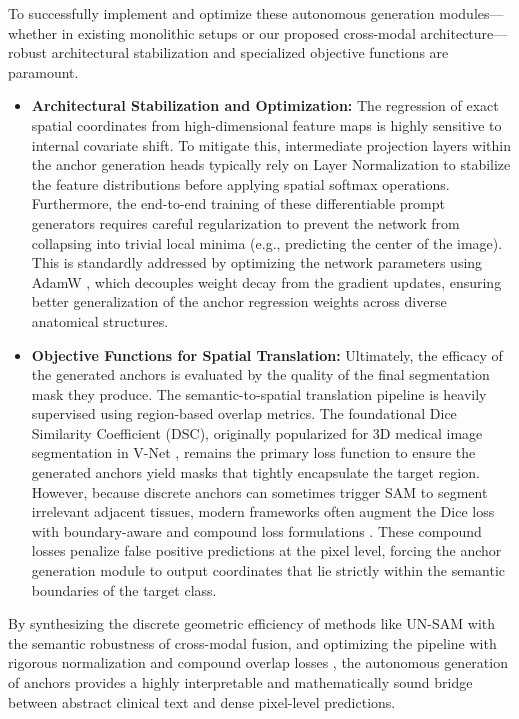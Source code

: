 \documentclass[onecolumn]{IEEEtran}
\numberwithin{equation}{section}
\theoremstyle{definition}
\theoremstyle{remark}
\begin{document}
To successfully implement and optimize these autonomous generation modules—whether in existing monolithic setups or our proposed cross-modal architecture—robust architectural stabilization and specialized objective functions are paramount. 
\begin{itemize}
    \item \textbf{Architectural Stabilization and Optimization:} The regression of exact spatial coordinates from high-dimensional feature maps is highly sensitive to internal covariate shift. To mitigate this, intermediate projection layers within the anchor generation heads typically rely on Layer Normalization \cite{ba2016layer} to stabilize the feature distributions before applying spatial softmax operations. Furthermore, the end-to-end training of these differentiable prompt generators requires careful regularization to prevent the network from collapsing into trivial local minima (e.g., predicting the center of the image). This is standardly addressed by optimizing the network parameters using AdamW \cite{loshchilov2017decoupled}, which decouples weight decay from the gradient updates, ensuring better generalization of the anchor regression weights across diverse anatomical structures.
    \item \textbf{Objective Functions for Spatial Translation:} Ultimately, the efficacy of the generated anchors is evaluated by the quality of the final segmentation mask they produce. The semantic-to-spatial translation pipeline is heavily supervised using region-based overlap metrics. The foundational Dice Similarity Coefficient (DSC), originally popularized for 3D medical image segmentation in V-Net \cite{milletari2016vnet}, remains the primary loss function to ensure the generated anchors yield masks that tightly encapsulate the target region. However, because discrete anchors can sometimes trigger SAM to segment irrelevant adjacent tissues, modern frameworks often augment the Dice loss with boundary-aware and compound loss formulations \cite{ma2021loss}. These compound losses penalize false positive predictions at the pixel level, forcing the anchor generation module to output coordinates that lie strictly within the semantic boundaries of the target class.
\end{itemize}

By synthesizing the discrete geometric efficiency of methods like UN-SAM \cite{chen2024un} with the semantic robustness of cross-modal fusion, and optimizing the pipeline with rigorous normalization \cite{ba2016layer} and compound overlap losses \cite{milletari2016vnet, ma2021loss}, the autonomous generation of anchors provides a highly interpretable and mathematically sound bridge between abstract clinical text and dense pixel-level predictions.
\end{document}
